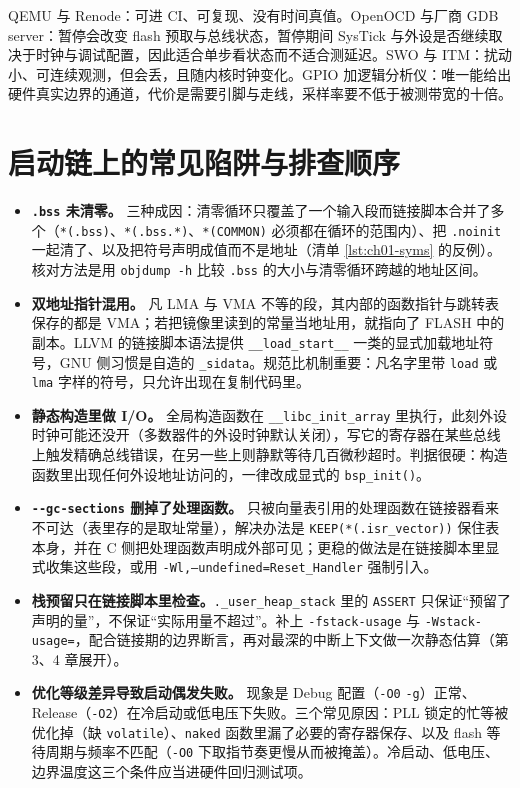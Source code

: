 \documentclass[12pt,a4paper,fontset=fandol]{ctexbook}
\newcommand{\Fn}[1]{\texttt{#1()}}
\newcommand{\Tp}[1]{\texttt{#1}}
\newcommand{\Opt}[1]{\texttt{-\/-#1}}
\begin{document}
\begin{compare}[title={四种观测手段的适用边界}]
QEMU 与 Renode：可进 CI、可复现、没有时间真值。OpenOCD 与厂商 GDB server：暂停会改变 flash 预取与总线状态，暂停期间 SysTick 与外设是否继续取决于时钟与调试配置，因此适合单步看状态而不适合测延迟。SWO 与 ITM：扰动小、可连续观测，但会丢，且随内核时钟变化。GPIO 加逻辑分析仪：唯一能给出硬件真实边界的通道，代价是需要引脚与走线，采样率要不低于被测带宽的十倍。
\end{compare}

\section{启动链上的常见陷阱与排查顺序}

\label{sec:ch01-pitfalls}

\begin{itemize}
  \item \textbf{\Tp{.bss} 未清零。} 三种成因：清零循环只覆盖了一个输入段而链接脚本合并了多个（\Tp{*(.bss)}、\Tp{*(.bss.*)}、\Tp{*(COMMON)} 必须都在循环的范围内）、把 \Tp{.noinit} 一起清了、以及把符号声明成值而不是地址（清单 \ref{lst:ch01-syms} 的反例）。核对方法是用 \Tp{objdump -h} 比较 \Tp{.bss} 的大小与清零循环跨越的地址区间。
  \item \textbf{双地址指针混用。} 凡 LMA 与 VMA 不等的段，其内部的函数指针与跳转表保存的都是 VMA；若把镜像里读到的常量当地址用，就指向了 FLASH 中的副本。LLVM 的链接脚本语法提供 \Tp{\_\_load\_start\_\_} 一类的显式加载地址符号，GNU 侧习惯是自造的 \Tp{\_sidata}。规范比机制重要：凡名字里带 \Tp{load} 或 \Tp{lma} 字样的符号，只允许出现在复制代码里。
  \item \textbf{静态构造里做 I/O。} 全局构造函数在 \Tp{\_\_libc\_init\_array} 里执行，此刻外设时钟可能还没开（多数器件的外设时钟默认关闭），写它的寄存器在某些总线上触发精确总线错误，在另一些上则静默等待几百微秒超时。判据很硬：构造函数里出现任何外设地址访问的，一律改成显式的 \Fn{bsp\_init}。
  \item \textbf{\Opt{gc-sections} 删掉了处理函数。} 只被向量表引用的处理函数在链接器看来不可达（表里存的是取址常量），解决办法是 \Tp{KEEP(*(.isr\_vector))} 保住表本身，并在 C 侧把处理函数声明成外部可见；更稳的做法是在链接脚本里显式收集这些段，或用 \Tp{-Wl,--undefined=Reset\_Handler} 强制引入。
  \item \textbf{栈预留只在链接脚本里检查。}\Tp{.\_user\_heap\_stack} 里的 \Tp{ASSERT} 只保证``预留了声明的量''，不保证``实际用量不超过''。补上 \Tp{-fstack-usage} 与 \Tp{-Wstack-usage=}，配合链接期的边界断言，再对最深的中断上下文做一次静态估算（第 3、4 章展开）。
  \item \textbf{优化等级差异导致启动偶发失败。} 现象是 Debug 配置（\Tp{-O0} \Tp{-g}）正常、Release（\Tp{-O2}）在冷启动或低电压下失败。三个常见原因：PLL 锁定的忙等被优化掉（缺 \Tp{volatile}）、\Tp{naked} 函数里漏了必要的寄存器保存、以及 flash 等待周期与频率不匹配（\Tp{-O0} 下取指节奏更慢从而被掩盖）。冷启动、低电压、边界温度这三个条件应当进硬件回归测试项。
\end{itemize}
\end{document}
